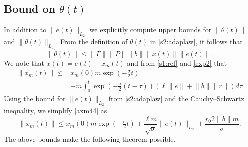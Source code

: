 \documentclass[10pt,journal]{IEEEtran}
\theoremstyle{plain}%
\theoremstyle{definition}
\newcommand{\be}[0]{\begin{equation}}
\newcommand{\ee}[0]{\end{equation}}
\newcommand{\ben}[0]{\begin{equation*}}
\newcommand{\een}[0]{\end{equation*}}
\newcommand{\norms}[1]{\lVert#1\rVert}
\newcommand{\normB}[0]{\norms}
\let\norm=\normB
\newcommand{\norml}[2]{\norm{#1}_{L_{#2}}}
\begin{document}


\subsection{Bound on $\dot\theta(t)$}

In addition to $\norm{e(t)}_{L_2}$ we explicitly compute upper bounds for $\norm{\dot\theta(t)}$ and $\norm{\dot{\theta}(t)}_{L_2}$. From the definition of $\dot\theta(t)$ in \eqref{s2:adaplaw}, it follows that
\ben
\norm{\dot\theta(t)} \leq \norm \Gamma \norm P  \norm b \norm{x(t)} \norm{e(t)}.
\een
We note that $x(t)= e(t) + x_m(t)$ and from \eqref{s1:ref} and \eqref{exp2} that
\be
\label{axm44}
\begin{split}
\norm{x_m(t)}\leq  &x_m(0) m  \exp\left( -\tfrac{\sigma}{2} t\right) \\ &+ m \int_0^t  \exp\left( -\tfrac{\sigma}{2} (t-\tau) \right) \left( \ell \norm{ e}+\norm b \norm r\right) d \tau
\end{split} \ee 
Using the bound for $\norm{e(t)}_{L_2}$ from \eqref{s2:adaplaw} and the Cauchy--Schwartz inequality, we simplify \eqref{axm44} as
\be\label{uhm}
\norm{x_m(t)} \leq  x_m(0) m  \exp\left( -\tfrac{\sigma}{2} t\right)+ \frac{\ell m}{\sqrt\sigma} \norml{e(t)}{2}+ \frac{ r_0 2 \norm{b} m} {\sigma}. 
\ee
The above bounds make the following theorem possible.
\end{document}
